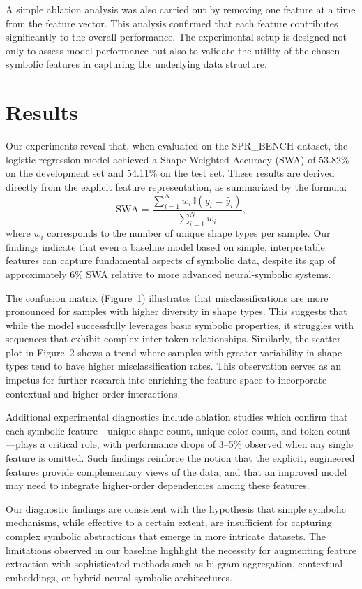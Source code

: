 \documentclass{article}
\begin{document}
A simple ablation analysis was also carried out by removing one feature at a time from the feature vector. This analysis confirmed that each feature contributes significantly to the overall performance. The experimental setup is designed not only to assess model performance but also to validate the utility of the chosen symbolic features in capturing the underlying data structure.

\section{Results}
Our experiments reveal that, when evaluated on the SPR\_BENCH dataset, the logistic regression model achieved a Shape-Weighted Accuracy (SWA) of 53.82\% on the development set and 54.11\% on the test set. These results are derived directly from the explicit feature representation, as summarized by the formula:
\[
\mathrm{SWA} = \frac{\sum_{i=1}^{N} w_i \, \mathbb{I}(y_i = \hat{y}_i)}{\sum_{i=1}^{N} w_i},
\]
where \(w_i\) corresponds to the number of unique shape types per sample. Our findings indicate that even a baseline model based on simple, interpretable features can capture fundamental aspects of symbolic data, despite its gap of approximately 6\% SWA relative to more advanced neural-symbolic systems.

The confusion matrix (Figure~1) illustrates that misclassifications are more pronounced for samples with higher diversity in shape types. This suggests that while the model successfully leverages basic symbolic properties, it struggles with sequences that exhibit complex inter-token relationships. Similarly, the scatter plot in Figure~2 shows a trend where samples with greater variability in shape types tend to have higher misclassification rates. This observation serves as an impetus for further research into enriching the feature space to incorporate contextual and higher-order interactions.

Additional experimental diagnostics include ablation studies which confirm that each symbolic feature—unique shape count, unique color count, and token count—plays a critical role, with performance drops of 3–5\% observed when any single feature is omitted. Such findings reinforce the notion that the explicit, engineered features provide complementary views of the data, and that an improved model may need to integrate higher-order dependencies among these features.

Our diagnostic findings are consistent with the hypothesis that simple symbolic mechanisms, while effective to a certain extent, are insufficient for capturing complex symbolic abstractions that emerge in more intricate datasets. The limitations observed in our baseline highlight the necessity for augmenting feature extraction with sophisticated methods such as bi-gram aggregation, contextual embeddings, or hybrid neural-symbolic architectures.
\end{document}
